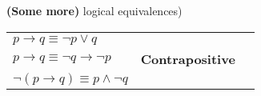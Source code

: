 
{\bf (Some more)} logical equivalences)


\begin{tabular}{llp{3in}}
    $p \to q \equiv \lnot p \lor q$ & & \\
    $p \to q \equiv \lnot q \to \lnot p$ & {\bf Contrapositive} \\
    $\lnot (p \to q) \equiv p\land \lnot q$  & &\\
\end{tabular}